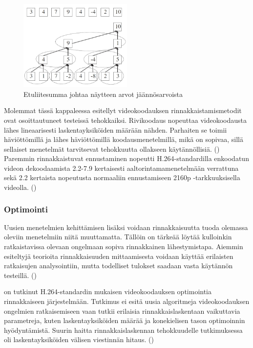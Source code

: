 \begin{figure}[ht]
	\centering
	\includegraphics[width=0.5\textwidth]{prefix_sum.jpg}
	\caption{Etuliitesumma johtaa näytteen arvot jäännösarvoista}
	\label{fig:prefix_sum}
\end{figure}

Molemmat tässä kappaleessa esitellyt videokoodauksen rinnakkaistamismetodit
ovat osoittautuneet testeissä tehokkaiksi. Rivikoodaus nopeuttaa videokoodausta
lähes lineaarisesti laskentayksiköiden määrään nähden. Parhaiten se toimii
häviöttömillä ja lähes häviöttömillä koodausmenetelmillä, mikä on sopivaa,
sillä sellaiset menetelmät tarvitsevat tehokkuutta ollakseen käytännöllisiä.
(\citealt{xu}) Paremmin rinnakkaistuvat ennustaminen nopeutti H.264-standardilla
enkoodatun videon dekoodaamista 2.2-7.9 kertaisesti aaltorintamamenetelmään
verrattuna sekä 2.2 kertaista nopeutusta normaaliin ennustamiseen 2160p
-tarkkuuksisella videolla. (\citealt{pieters})

\subsubsection{Optimointi}

Uusien menetelmien kehittämisen lisäksi voidaan rinnakkaisuutta tuoda
olemassa oleviin menetelmiin niitä muuttamatta. Tällöin on tärkeää löytää
kulloinkin ratkaistavissa olevaan ongelmaan sopiva rinnakkainen lähestymistapa.
Aiemmin esiteltyjä teorioita rinnakkaisuuden mittaamisesta voidaan käyttää
erilaisten ratkaisujen analysointiin, mutta todelliset tulokset saadaan
vasta käytännön testeillä. (\citealt{li})

\citealt{li} on tutkinut H.264-standardin mukaisen videokoodauksen optimointia
rinnakkaiseen järjestelmään. Tutkimus ei esitä uusia algoritmeja
videokoodauksen ongelmien ratkaisemiseen vaan tutkii erilaisia
rinnakkaislaskentaan vaikuttavia parametreja, kuten laskentayksiköiden määrää
ja konekielisen tason optimoinnin hyödyntämistä. Suurin haitta
rinnakkaislaskennan tehokkuudelle tutkimuksessa oli laskentayksiköiden välisen
viestinnän hitaus. (\citealt{li})

